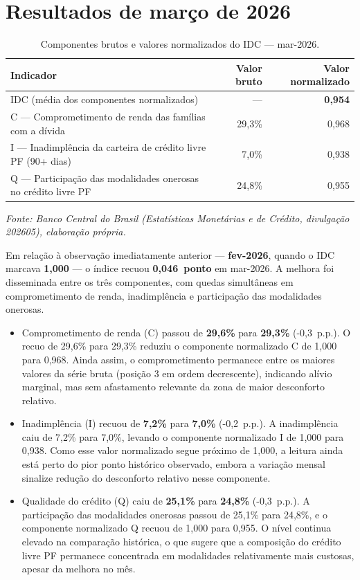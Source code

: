 \documentclass[11pt,a4paper]{article}
\newcommand{\fonte}[1]{%
  \par\vspace{0.2\baselineskip}%
  \small\textit{Fonte: #1}\par\vspace{0.8\baselineskip}%
}
\newcommand{\mesreferencia}{março de 2026}   %
\newcommand{\mesref}{mar-2026}                        %
\newcommand{\mesanterior}{fev-2026}                   %
\newcommand{\competencia}{202605}                     %
\begin{document}
\section{Resultados de \mesreferencia}

\begin{table}[htbp]
  \centering
  \caption{Componentes brutos e valores normalizados do IDC --- \mesref.}
  \label{tab:componentes}
  \begin{tabular}{p{8.0cm}rr}
    \toprule
    Indicador & Valor bruto & Valor normalizado \\
    \midrule
    IDC (média dos componentes normalizados)
      & ---
      & \textbf{0,954} \\
    C --- Comprometimento de renda das famílias com a dívida
      & 29,3\%
      & 0,968 \\
    I --- Inadimplência da carteira de crédito livre PF (90+ dias)
      & 7,0\%
      & 0,938 \\
    Q --- Participação das modalidades onerosas no crédito livre PF
      & 24,8\%
      & 0,955 \\
    \bottomrule
  \end{tabular}
\end{table}

\fonte{Banco Central do Brasil (Estatísticas Monetárias e de Crédito,
divulgação \competencia), elaboração própria.}

Em relação à observação imediatamente anterior --- \textbf{\mesanterior}, quando o IDC
marcava \textbf{1,000} --- o índice recuou
\textbf{0,046~ponto} em \mesref.
A melhora foi disseminada entre os três componentes, com quedas simultâneas em comprometimento de renda, inadimplência e participação das modalidades onerosas.

\begin{itemize}
  \item Comprometimento de renda (C) passou de \textbf{29,6\%} para
    \textbf{29,3\%} (-0,3~p.p.).
    O recuo de 29,6\% para 29,3\% reduziu o componente normalizado C de 1,000 para 0,968. Ainda assim, o comprometimento permanece entre os maiores valores da série bruta (posição 3 em ordem decrescente), indicando alívio marginal, mas sem afastamento relevante da zona de maior desconforto relativo.

  \item Inadimplência (I) recuou de
    \textbf{7,2\%} para \textbf{7,0\%}
    (-0,2~p.p.).
    A inadimplência caiu de 7,2\% para 7,0\%, levando o componente normalizado I de 1,000 para 0,938. Como esse valor normalizado segue próximo de 1,000, a leitura ainda está perto do pior ponto histórico observado, embora a variação mensal sinalize redução do desconforto relativo nesse componente.

  \item Qualidade do crédito (Q) caiu de
    \textbf{25,1\%} para \textbf{24,8\%}
    (-0,3~p.p.).
    A participação das modalidades onerosas passou de 25,1\% para 24,8\%, e o componente normalizado Q recuou de 1,000 para 0,955. O nível continua elevado na comparação histórica, o que sugere que a composição do crédito livre PF permanece concentrada em modalidades relativamente mais custosas, apesar da melhora no mês.
\end{itemize}
\end{document}
